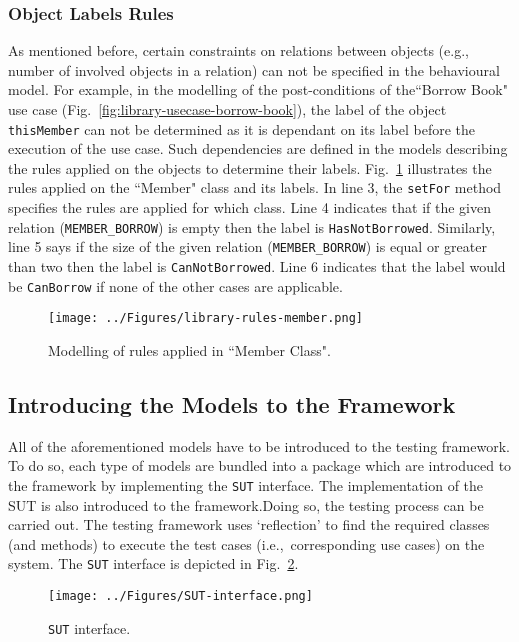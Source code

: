 \subsubsection{Object Labels Rules}
\label{sec:subsidiary-models-object-labels}
As mentioned before, certain constraints on relations between objects (e.g., number of involved objects in a relation) can not be specified in the behavioural model. For example, in the modelling of the post-conditions of  the``Borrow Book" use case (Fig.~\ref{fig:library-usecase-borrow-book}), the label of the object \texttt{thisMember} can not be determined as it is dependant on its label before the execution of the use case. 
Such dependencies are defined in the models describing the rules applied on the objects to determine their labels. Fig.~\ref{fig:library-rules-member} illustrates the rules applied on the ``Member" class and its labels. In line 3, the \texttt{setFor} method specifies the rules are applied for which class. Line 4 indicates that if the given relation (\texttt{MEMBER\_BORROW}) is empty then the label is \texttt{HasNotBorrowed}. Similarly, line 5 says if the size of the given relation (\texttt{MEMBER\_BORROW}) is equal or greater than two then the label is \texttt{CanNotBorrowed}. Line 6 indicates that the label would be \texttt{CanBorrow} if none of the other cases are applicable.

\begin{figure}[h]
\centering
\texttt{[image: ../Figures/library-rules-member.png]}
\caption{Modelling of rules applied in ``Member Class".}
\label{fig:library-rules-member}
\end{figure}

\subsection{Introducing the Models to the Framework}
\label{sec:create-test model-introducing-models}
All of the aforementioned models have to be introduced to the testing framework. To do so, each type of models are bundled into a package which are introduced to the framework by implementing the \texttt{SUT} interface. The implementation of the SUT is also introduced to the framework.Doing so, the testing process can be carried out.
The testing framework uses `reflection' to find the required classes (and methods) to execute the test cases (i.e.,\ corresponding use cases) on the system. The \texttt{SUT} interface is depicted in Fig.~\ref{fig:SUT-interface}. 

\begin{figure}[h]
\centering
\texttt{[image: ../Figures/SUT-interface.png]}
\caption{\texttt{SUT} interface.}
\label{fig:SUT-interface}
\end{figure}
